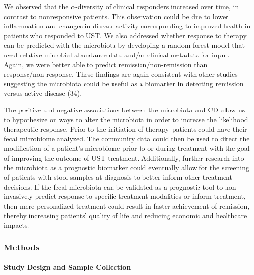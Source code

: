 \documentclass[12pt,]{article}
\let\oldparagraph\paragraph
\renewcommand{\paragraph}[1]{\oldparagraph{#1}\mbox{}}
\begin{document}
We observed that the \({\alpha}\)-diversity of clinical responders
increased over time, in contrast to nonresponsive patients. This
observation could be due to lower inflammation and changes in disease
activity corresponding to improved health in patients who responded to
UST. We also addressed whether response to therapy can be predicted with
the microbiota by developing a random-forest model that used relative
microbial abundance data and/or clinical metadata for input. Again, we
were better able to predict remission/non-remission than
response/non-response. These findings are again consistent with other
studies suggesting the microbiota could be useful as a biomarker in
detecting remission versus active disease (34).

The positive and negative associations between the microbiota and CD
allow us to hypothesize on ways to alter the microbiota in order to
increase the likelihood therapeutic response. Prior to the initiation of
therapy, patients could have their fecal microbiome analyzed. The
community data could then be used to direct the modification of a
patient's microbiome prior to or during treatment with the goal of
improving the outcome of UST treatment. Additionally, further research
into the microbiota as a prognostic biomarker could eventually allow for
the screening of patients with stool samples at diagnosis to better
inform other treatment decisions. If the fecal microbiota can be
validated as a prognostic tool to non-invasively predict response to
specific treatment modalities or inform treatment, then more
personalized treatment could result in faster achievement of remission,
thereby increasing patients' quality of life and reducing economic and
healthcare impacts.

\newpage

\subsubsection{Methods}\label{methods}

\paragraph{Study Design and Sample
Collection}\label{study-design-and-sample-collection}
\end{document}
